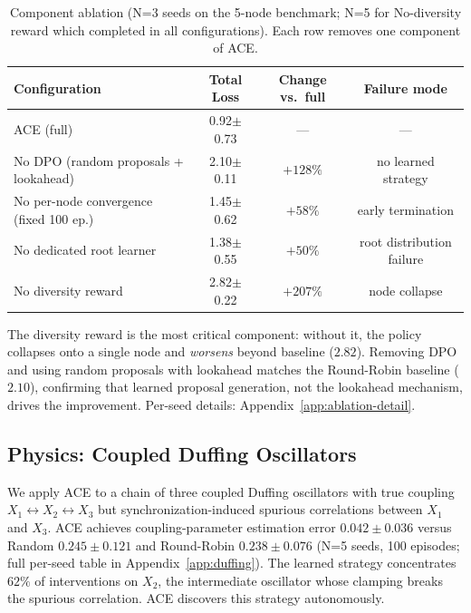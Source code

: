 \documentclass{article}
\theoremstyle{plain}
\theoremstyle{definition}
\theoremstyle{remark}
\begin{document}
\begin{table}[t]
\centering
\caption{Component ablation (N=3 seeds on the 5-node benchmark; N=5 for No-diversity reward which completed in all configurations). Each row removes one component of ACE.}
\label{tab:ablations}
\small
\begin{tabular}{@{}lccc@{}}
\toprule
Configuration & Total Loss & Change vs.\ full & Failure mode \\
\midrule
ACE (full) & 0.92$\pm$0.73 & --- & --- \\
\midrule
No DPO (random proposals + lookahead) & 2.10$\pm$0.11 & $+128\%$ & no learned strategy \\
No per-node convergence (fixed 100 ep.) & 1.45$\pm$0.62 & $+58\%$ & early termination \\
No dedicated root learner & 1.38$\pm$0.55 & $+50\%$ & root distribution failure \\
No diversity reward & 2.82$\pm$0.22 & $+207\%$ & node collapse \\
\bottomrule
\end{tabular}
\end{table}

The diversity reward is the most critical component: without it, the policy collapses onto a single node and \emph{worsens} beyond baseline ($2.82$). Removing DPO and using random proposals with lookahead matches the Round-Robin baseline ($2.10$), confirming that learned proposal generation, not the lookahead mechanism, drives the improvement. Per-seed details: Appendix~\ref{app:ablation-detail}.

\subsection{Physics: Coupled Duffing Oscillators}
\label{sec:results-duffing}

We apply ACE to a chain of three coupled Duffing oscillators \citep{kovacic2011duffing} with true coupling $X_1 \leftrightarrow X_2 \leftrightarrow X_3$ but synchronization-induced spurious correlations between $X_1$ and $X_3$. ACE achieves coupling-parameter estimation error $0.042\pm0.036$ versus Random $0.245\pm0.121$ and Round-Robin $0.238\pm0.076$ (N=5 seeds, 100 episodes; full per-seed table in Appendix~\ref{app:duffing}). The learned strategy concentrates $62\%$ of interventions on $X_2$, the intermediate oscillator whose clamping breaks the spurious correlation. ACE discovers this strategy autonomously.

\end{document}

